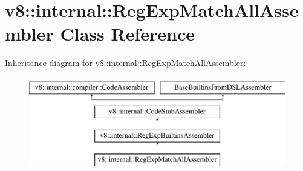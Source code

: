 \hypertarget{classv8_1_1internal_1_1RegExpMatchAllAssembler}{}\section{v8\+:\+:internal\+:\+:Reg\+Exp\+Match\+All\+Assembler Class Reference}
\label{classv8_1_1internal_1_1RegExpMatchAllAssembler}
Inheritance diagram for v8\+:\+:internal\+:\+:Reg\+Exp\+Match\+All\+Assembler\+:\begin{figure}[H]
\begin{center}
\leavevmode
\includegraphics[height=4.000000cm]{classv8_1_1internal_1_1RegExpMatchAllAssembler}
\end{center}
\end{figure}
